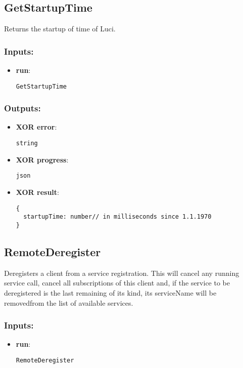 \subsection{GetStartupTime}
\label{ch:builtinservices:GetStartupTime}
Returns the startup of time of Luci.
\subsubsection*{Inputs:}
\begin{itemize}
  \small
    \item \textbf{run}: 
\begin{lstlisting}
GetStartupTime
\end{lstlisting}
  \end{itemize}
\subsubsection*{Outputs:}
\begin{itemize}
  \small
    \item \textbf{XOR error}: 
\begin{lstlisting}
string
\end{lstlisting}
    \item \textbf{XOR progress}: 
\begin{lstlisting}
json
\end{lstlisting}
    \item \textbf{XOR result}: 
\begin{lstlisting}
{
  startupTime: number// in milliseconds since 1.1.1970
}
\end{lstlisting}
  \end{itemize}

\subsection{RemoteDeregister}
\label{ch:builtinservices:RemoteDeregister}
Deregisters
 a client from a service registration. This will cancel any running 
service call, cancel all subscriptions of this client and, if the 
service to be deregistered is the last remaining of its kind, its 
serviceName will be removedfrom the list of available services.
\subsubsection*{Inputs:}
\begin{itemize}
  \small
    \item \textbf{run}: 
\begin{lstlisting}
RemoteDeregister
\end{lstlisting}
  \end{itemize}
